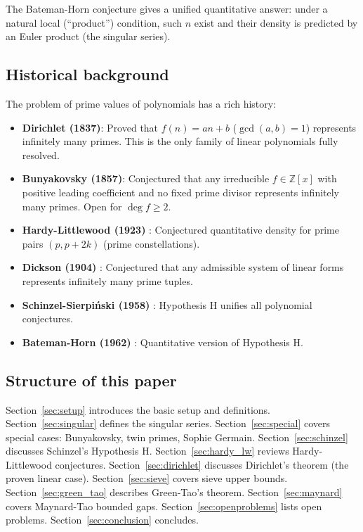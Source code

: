 \documentclass[12pt,a4paper]{amsart}
\theoremstyle{definition}
\theoremstyle{remark}
\newcommand{\Z}{\mathbb{Z}}
\begin{document}
The Bateman-Horn conjecture \cite{BH1962} gives a unified quantitative answer:
under a natural local (``product'') condition, such $n$ exist and their density is
predicted by an Euler product (the singular series).

\subsection{Historical background}

The problem of prime values of polynomials has a rich history:
\begin{itemize}
  \item \textbf{Dirichlet (1837)}: Proved that $f(n) = an + b$ ($\gcd(a,b)=1$) represents
    infinitely many primes. This is the only family of linear polynomials fully resolved.
  \item \textbf{Bunyakovsky (1857)}: Conjectured that any irreducible $f \in \Z[x]$ with
    positive leading coefficient and no fixed prime divisor represents infinitely many primes.
    Open for $\deg f \geq 2$.
  \item \textbf{Hardy-Littlewood (1923)} \cite{HL1923}: Conjectured quantitative density
    for prime pairs $(p, p+2k)$ (prime constellations).
  \item \textbf{Dickson (1904)} \cite{Dickson1904}: Conjectured that any admissible
    system of linear forms represents infinitely many prime tuples.
  \item \textbf{Schinzel-Sierpiński (1958)} \cite{Schinzel1958}: Hypothesis H unifies
    all polynomial conjectures.
  \item \textbf{Bateman-Horn (1962)} \cite{BH1962}: Quantitative version of Hypothesis H.
\end{itemize}

\subsection{Structure of this paper}
Section~\ref{sec:setup} introduces the basic setup and definitions.
Section~\ref{sec:singular} defines the singular series.
Section~\ref{sec:special} covers special cases: Bunyakovsky, twin primes, Sophie Germain.
Section~\ref{sec:schinzel} discusses Schinzel's Hypothesis H.
Section~\ref{sec:hardy_lw} reviews Hardy-Littlewood conjectures.
Section~\ref{sec:dirichlet} discusses Dirichlet's theorem (the proven linear case).
Section~\ref{sec:sieve} covers sieve upper bounds.
Section~\ref{sec:green_tao} describes Green-Tao's theorem.
Section~\ref{sec:maynard} covers Maynard-Tao bounded gaps.
Section~\ref{sec:openproblems} lists open problems.
Section~\ref{sec:conclusion} concludes.
\end{document}
